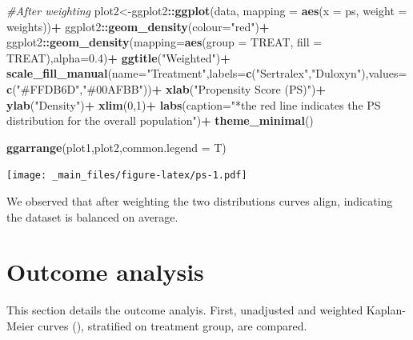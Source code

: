 \documentclass[
]{book}
\newenvironment{Shaded}{\begin{snugshade}}{\end{snugshade}}
\newcommand{\AttributeTok}[1]{\textcolor[rgb]{0.13,0.29,0.53}{#1}}
\newcommand{\CommentTok}[1]{\textcolor[rgb]{0.56,0.35,0.01}{\textit{#1}}}
\newcommand{\DecValTok}[1]{\textcolor[rgb]{0.00,0.00,0.81}{#1}}
\newcommand{\FloatTok}[1]{\textcolor[rgb]{0.00,0.00,0.81}{#1}}
\newcommand{\FunctionTok}[1]{\textcolor[rgb]{0.13,0.29,0.53}{\textbf{#1}}}
\newcommand{\NormalTok}[1]{#1}
\newcommand{\OtherTok}[1]{\textcolor[rgb]{0.56,0.35,0.01}{#1}}
\newcommand{\SpecialCharTok}[1]{\textcolor[rgb]{0.81,0.36,0.00}{\textbf{#1}}}
\newcommand{\StringTok}[1]{\textcolor[rgb]{0.31,0.60,0.02}{#1}}
\begin{document}
\begin{Shaded}
\begin{Highlighting}[]
\CommentTok{\#After weighting}
\NormalTok{plot2}\OtherTok{\textless{}{-}}\NormalTok{ggplot2}\SpecialCharTok{::}\FunctionTok{ggplot}\NormalTok{(data, }\AttributeTok{mapping =} \FunctionTok{aes}\NormalTok{(}\AttributeTok{x =}\NormalTok{ ps, }\AttributeTok{weight =}\NormalTok{ weights))}\SpecialCharTok{+}
\NormalTok{  ggplot2}\SpecialCharTok{::}\FunctionTok{geom\_density}\NormalTok{(}\AttributeTok{colour=}\StringTok{"red"}\NormalTok{)}\SpecialCharTok{+}
\NormalTok{  ggplot2}\SpecialCharTok{::}\FunctionTok{geom\_density}\NormalTok{(}\AttributeTok{mapping=}\FunctionTok{aes}\NormalTok{(}\AttributeTok{group =}\NormalTok{ TREAT, }\AttributeTok{fill =}\NormalTok{ TREAT),}\AttributeTok{alpha=}\FloatTok{0.4}\NormalTok{)}\SpecialCharTok{+}
  \FunctionTok{ggtitle}\NormalTok{(}\StringTok{"Weighted"}\NormalTok{)}\SpecialCharTok{+}
  \FunctionTok{scale\_fill\_manual}\NormalTok{(}\AttributeTok{name=}\StringTok{"Treatment"}\NormalTok{,}\AttributeTok{labels=}\FunctionTok{c}\NormalTok{(}\StringTok{"Sertralex"}\NormalTok{,}\StringTok{"Duloxyn"}\NormalTok{),}\AttributeTok{values=}\FunctionTok{c}\NormalTok{(}\StringTok{"\#FFDB6D"}\NormalTok{,}\StringTok{"\#00AFBB"}\NormalTok{))}\SpecialCharTok{+}
  \FunctionTok{xlab}\NormalTok{(}\StringTok{"Propensity Score (PS)"}\NormalTok{)}\SpecialCharTok{+}
  \FunctionTok{ylab}\NormalTok{(}\StringTok{"Density"}\NormalTok{)}\SpecialCharTok{+}
  \FunctionTok{xlim}\NormalTok{(}\DecValTok{0}\NormalTok{,}\DecValTok{1}\NormalTok{)}\SpecialCharTok{+}
  \FunctionTok{labs}\NormalTok{(}\AttributeTok{caption=}\StringTok{"*the red line indicates the PS distribution for the overall population"}\NormalTok{)}\SpecialCharTok{+}
  \FunctionTok{theme\_minimal}\NormalTok{()}
  
\FunctionTok{ggarrange}\NormalTok{(plot1,plot2,}\AttributeTok{common.legend =}\NormalTok{ T)}
\end{Highlighting}
\end{Shaded}

\texttt{[image: \_main\_files/figure-latex/ps-1.pdf]}

We observed that after weighting the two distributions curves align,
indicating the dataset is balanced on average.

\section{Outcome analysis}\label{outcome-analysis}

This section details the outcome analyis. First, unadjusted and weighted
Kaplan-Meier curves (), stratified on treatment group, are compared.
\end{document}
